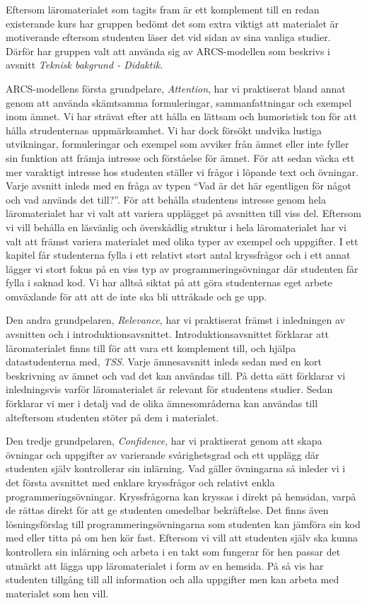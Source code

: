 \documentclass[]{article}
\begin{document}
Eftersom läromaterialet som tagits fram är ett komplement till en redan existerande kurs har gruppen
bedömt det som extra viktigt att materialet är motiverande eftersom studenten läser det vid sidan av
sina vanliga studier. Därför har gruppen valt att använda sig av ARCS-modellen som beskrivs i avsnitt
\textit{Teknisk bakgrund - Didaktik}.

ARCS-modellens första grundpelare, \textit{Attention}, har vi praktiserat bland annat genom att använda
skämtsamma formuleringar, sammanfattningar och exempel inom ämnet. Vi har strävat efter att hålla en
lättsam och humoristisk ton för att hålla strudenternas uppmärksamhet. Vi har dock försökt undvika
lustiga utvikningar, formuleringar och exempel som avviker från ämnet eller inte fyller sin funktion
att främja intresse och förståelse för ämnet. För att sedan väcka ett mer varaktigt intresse hos
studenten ställer vi frågor i löpande text och övningar. Varje avsnitt inleds med en fråga av typen
“Vad är det här egentligen för något och vad används det till?”. För att behålla studentens intresse
genom hela läromaterialet har vi valt att variera upplägget på avsnitten till viss del. Eftersom vi
vill behålla en läsvänlig och överskådlig struktur i hela läromaterialet har vi valt att främst variera
materialet med olika typer av exempel och uppgifter. I ett kapitel får studenterna fylla i ett relativt
stort antal kryssfrågor och i ett annat lägger vi stort fokus på en viss typ av programmeringsövningar
där studenten får fylla i saknad kod. Vi har alltså siktat på att göra studenternas eget arbete
omväxlande för att att de inte ska bli uttråkade och ge upp.

Den andra grundpelaren, \textit{Relevance}, har vi praktiserat främst i inledningen av avsnitten och i
introduktionsavsnittet. Introduktionsavsnittet förklarar att läromaterialet finns till för att vara ett
komplement till, och hjälpa datastudenterna med, \textit{TSS}. Varje ämnesavsnitt inleds sedan med en kort
beskrivning av ämnet och vad det kan användas till. På detta sätt förklarar vi inledningsvis varför
läromaterialet är relevant för studentens studier. Sedan förklarar vi mer i detalj vad de olika
ämnesområderna kan användas till alteftersom studenten stöter på dem i materialet.

Den tredje grundpelaren, \textit{Confidence}, har vi praktiserat genom att skapa övningar och uppgifter
av varierande svårighetsgrad och ett upplägg där studenten själv kontrollerar sin inlärning. Vad gäller
övningarna så inleder vi i det första avsnittet med enklare kryssfrågor och relativt enkla
programmeringsövningar. Kryssfrågorna kan kryssas i direkt på hemsidan, varpå de rättas direkt för att
ge studenten omedelbar bekräftelse. Det finns även lösningsförslag till programmeringsövningarna som
studenten kan jämföra sin kod med eller titta på om hen kör fast. Eftersom vi vill att studenten själv
ska kunna kontrollera sin inlärning och arbeta i en takt som fungerar för hen passar det utmärkt att
lägga upp läromaterialet i form av en hemsida. På så vis har studenten tillgång till all information och
alla uppgifter men kan arbeta med materialet som hen vill.
\end{document}
